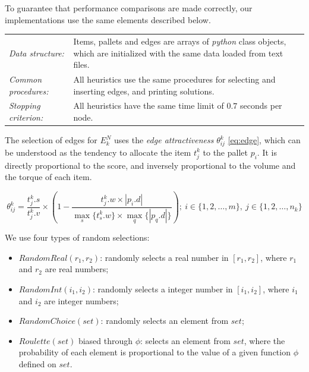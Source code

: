 \documentclass[preprint,authoryear]{elsarticle}
\begin{document}
To guarantee that performance comparisons are made correctly, our implementations use the same elements described below.


\bgroup
\def\arraystretch{1.2}
\begin{table}[H]
	\centering
	\small
	\begin{tabular}{CD}
		
		{\it Data structure:}       & Items, pallets and edges are arrays of \emph{python} class objects, which are initialized with the same data loaded from text files. \\
		
		{\it Common procedures:}    & All heuristics use the same procedures for selecting and inserting edges, and printing solutions.  \\	
		
		{\it Stopping criterion:} & All heuristics have the same time limit of $0.7$ seconds per node.\\

	\end{tabular}
	\normalsize
\end{table}
\egroup

The selection of edges for $E^N_k$\/ uses the {\it edge attractiveness}\/ $\theta^k_{ij}$\/ \ref{eq:edge}, which can be understood as the tendency to allocate the item $t^k_j$\/ to the pallet $p_i$. It is directly proportional to the score, and inversely proportional to the volume and the torque of each item.

\begin{equation} \label{eq:edge}
	\theta^k_{ij}= \frac{t^k_j.s}{t^k_j.v}\times(1-\frac{t^k_j.w\times|p_i.d|}{\max_s\{t^k_s.w\}\times\max_q\{|p_q.d|\}});\ i \in \{1,2,\ldots,m\},\ j \in \{1,2,\ldots,n_k\}
\end{equation} 


We use four types of random selections:
\begin{itemize}
	\item $RandomReal(r_1,r_2)$: randomly selects a real number in $[r_1,r_2]$, where $r_1$ and $r_2$ are real numbers;
	\item $RandomInt(i_1,i_2)$: randomly selects a integer number in $[i_1,i_2]$, where $i_1$ and $i_2$ are integer numbers;
	\item $RandomChoice(set)$: randomly selects an element from $set$;
	\item $Roulette(set)$ biased through $\phi$: selects an element from $set$, where the probability of each element is proportional to the value of a given function $\phi$\/ defined on $set$.
\end{itemize}
\end{document}
